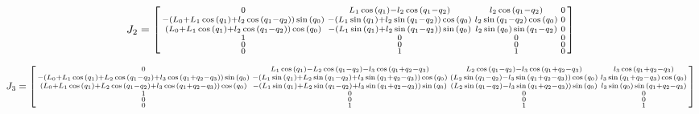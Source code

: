 \documentclass{article}
\begin{document}
\begin{equation}
	J_2 = \begin{bsmallmatrix}
	0 & L_{1} \cos{(q_{1} )} - l_{2} \cos{(q_{1} - q_{2} )} & l_{2} \cos{(q_{1} - q_{2} )} & 0\\
	- (L_{0} + L_{1} \cos{(q_{1} )} + l_{2} \cos{(q_{1} - q_{2} )}) \sin{(q_{0} )} & - (L_{1} \sin{(q_{1} )} + l_{2} \sin{(q_{1} - q_{2} )}) \cos{(q_{0} )} & l_{2} \sin{(q_{1} - q_{2} )} \cos{(q_{0} )} & 0\\
	(L_{0} + L_{1} \cos{(q_{1} )} + l_{2} \cos{(q_{1} - q_{2} )}) \cos{(q_{0} )} & - (L_{1} \sin{(q_{1} )} +l_{2} \sin{(q_{1} - q_{2} )}) \sin{(q_{0} )} & l_{2} \sin{(q_{0} )} \sin{(q_{1} - q_{2} )} & 0\\
	1 & 0 & 0& 0\\
	0 & 0 & 0 & 0\\
	0 & 1 & 1 & 0
\end{bsmallmatrix}
\end{equation}

\begin{equation}
	J_3 = \begin{bsmallmatrix}
	0 & L_{1} \cos{(q_{1} )} - L_{2} \cos{(q_{1} - q_{2} )} - l_{3} \cos{(q_{1} + q_{2} - q_{3} )} & L_{2} \cos{(q_{1} - q_{2} )} - l_{3} \cos{(q_{1} + q_{2} - q_{3} )} & l_{3} \cos{(q_{1} + q_{2} - q_{3} )}\\- (L_{0} + L_{1} \cos{(q_{1} )} + L_{2} \cos{(q_{1} - q_{2} )} + l_{3} \cos{(q_{1} + q_{2} - q_{3} )}) \sin{(q_{0} )} & - (L_{1} \sin{(q_{1} )} + L_{2} \sin{(q_{1} - q_{2} )} + l_{3} \sin{(q_{1} + q_{2} - q_{3} )}) \cos{(q_{0} )} & (L_{2} \sin{(q_{1} - q_{2} )} - l_{3} \sin{(q_{1} + q_{2} - q_{3} )}) \cos{(q_{0} )} & l_{3} \sin{(q_{1} + q_{2} - q_{3} )} \cos{(q_{0} )}\\
	(L_{0} + L_{1} \cos{(q_{1} )} + L_{2} \cos{(q_{1} - q_{2} )} + l_{3}\cos{(q_{1} + q_{2} - q_{3} )}) \cos{(q_{0} )} & - (L_{1} \sin{(q_{1} )} + L_{2} \sin{(q_{1} - q_{2} )} + l_{3} \sin{(q_{1} + q_{2} - q_{3} )}) \sin{(q_{0} )} & (L_{2} \sin{(q_{1} - q_{2} )} - l_{3} \sin{(q_{1} + q_{2} - q_{3} )}) \sin{(q_{0} )} & l_{3} \sin{(q_{0} )} \sin{(q_{1} + q_{2} - q_{3} )}\\
	1 & 0 & 0 & 0\\
	0 & 0 & 0 & 0\\
	0 & 1 & 1 & 1
\end{bsmallmatrix}
\end{equation}
\end{document}
